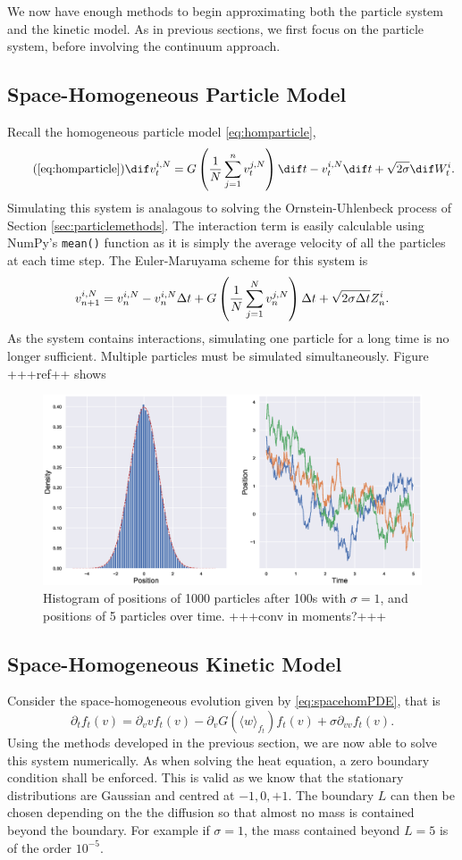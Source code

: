 We now have enough methods to begin approximating both the particle system and the kinetic model. As in previous sections, we first focus on the particle system, before involving the continuum approach. 
\subsection{Space-Homogeneous Particle Model}\label{sec:homparticles}
Recall the homogeneous particle model \eqref{eq:homparticle},
\begin{equation}\tag{\ref{eq:homparticle}}
\dif v^{i,N}_t = G\left(\frac{1}{N}\sum_{j=1}^n v^{j,N}_t\right)\dif t-v^{i,N}_t \dif t + \sqrt{2\sigma} \dif W^i_t.
\end{equation}
Simulating this system is analagous to solving the Ornstein-Uhlenbeck process of Section \ref{sec:particlemethods}. The interaction term is easily calculable using NumPy's \texttt{mean()} function as it is simply the average velocity of all the particles at each time step. The Euler-Maruyama scheme for this system is
\[ v^{i,N}_{n+1} = v^{i,N}_n - v^{i,N}_n\Delta t + G\left(\frac{1}{N}\sum_{j=1}^N v^{j,N}_n\right)\Delta t+ \sqrt{2\sigma\Delta t} Z^i_n. \]
As the system contains interactions, simulating one particle for a long time is no longer sufficient. Multiple particles must be simulated simultaneously. Figure +++ref++ shows 
\begin{figure}
    \centering
    \includegraphics[width=0.7\linewidth]{Figures/OUparticletraj}
    \caption{Histogram of positions of 1000 particles after 100s with $\sigma = 1$, and positions of 5 particles over time. +++conv in moments?+++}
    \label{fig:ouparticletraj}
\end{figure}

\subsection{Space-Homogeneous Kinetic Model}\label{sec:homkin}
 Consider the space-homogeneous evolution given by \eqref{eq:spacehomPDE}, that is
    \begin{equation}
    \partial_t f_t(v) = \partial_v vf_t(v) - \partial_v G(\langle w \rangle_{f_t})f_t(v) + \sigma \partial_{vv} f_t(v).
    \end{equation}
    Using the methods developed in the previous section, we are now able to solve this system numerically. As when solving the heat equation, a zero boundary condition shall be enforced. This is valid as we know that the stationary distributions are Gaussian and centred at $-1,0,+1$. The boundary $L$ can then be chosen depending on the the diffusion so that almost no mass is contained beyond the boundary. For example if $\sigma = 1$, the mass contained beyond $L=5$ is of the order $10^{-5}$. 
    
